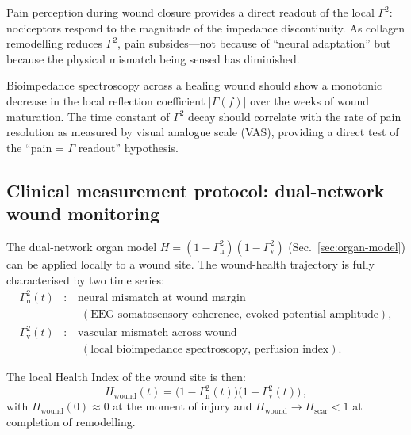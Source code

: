 ﻿\documentclass[aps,pre,twocolumn,superscriptaddress,floatfix]{revtex4-2}
\newcommand{\Gv}{\Gamma_{\mathrm{v}}}
\newcommand{\Gn}{\Gamma_{\mathrm{n}}}
\begin{document}
Pain perception during wound closure provides a direct
readout of the local $\Gamma^2$: nociceptors respond to
the magnitude of the impedance discontinuity.
As collagen remodelling reduces $\Gamma^2$, pain
subsides---not because of ``neural adaptation'' but
because the physical mismatch being sensed has diminished.

\begin{remark}
Bioimpedance spectroscopy across a healing wound should
show a monotonic decrease in the local reflection
coefficient $|\Gamma(f)|$ over the weeks of wound
maturation.  The time constant of $\Gamma^2$ decay should
correlate with the rate of pain resolution as measured by
visual analogue scale (VAS), providing a direct test of
the ``pain = $\Gamma$ readout'' hypothesis.
\end{remark}

\subsection{Clinical measurement protocol:
  dual-network wound monitoring}
\label{sec:wound-protocol}

The dual-network organ model
$H=(1-\Gn^2)(1-\Gv^2)$ (Sec.~\ref{sec:organ-model})
can be applied locally to a wound site.
The wound-health trajectory is fully characterised by
two time series:
\begin{align}
  \Gn^2(t) &:\quad \text{neural mismatch at wound margin}
    \nonumber\\
  &\quad\;\; (\text{EEG somatosensory coherence,
    evoked-potential amplitude}),
    \label{eq:wound-Gn}\\
  \Gv^2(t) &:\quad \text{vascular mismatch across wound}
    \nonumber\\
  &\quad\;\; (\text{local bioimpedance spectroscopy,
    perfusion index}).
    \label{eq:wound-Gv}
\end{align}

The local Health Index of the wound site is then:
\begin{equation}
  H_{\text{wound}}(t) =
    \bigl(1-\Gn^2(t)\bigr)
    \bigl(1-\Gv^2(t)\bigr)\,,
  \label{eq:wound-health}
\end{equation}
with $H_{\text{wound}}(0)\approx 0$ at the moment of
injury and $H_{\text{wound}}\to H_{\text{scar}}<1$ at
completion of remodelling.
\end{document}
